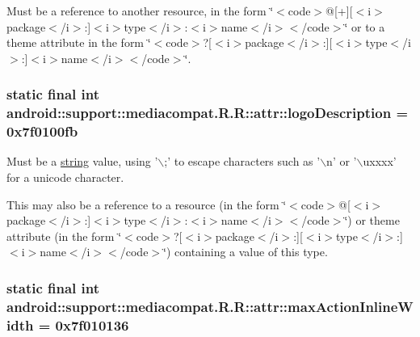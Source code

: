 Must be a reference to another resource, in the form \char`\"{}$<$code$>$@\mbox{[}+\mbox{]}\mbox{[}$<$i$>$package$<$/i$>$:\mbox{]}$<$i$>$type$<$/i$>$:$<$i$>$name$<$/i$>$$<$/code$>$\char`\"{} or to a theme attribute in the form \char`\"{}$<$code$>$?\mbox{[}$<$i$>$package$<$/i$>$:\mbox{]}\mbox{[}$<$i$>$type$<$/i$>$:\mbox{]}$<$i$>$name$<$/i$>$$<$/code$>$\char`\"{}. \hypertarget{classandroid_1_1support_1_1mediacompat_1_1_r_1_1attr_58b67763c19a3b84ff3f81473e75b009}{
\subsubsection[{logoDescription}]{\setlength{\rightskip}{0pt plus 5cm}static final int android::support::mediacompat.R.R::attr::logoDescription = 0x7f0100fb}}
\label{classandroid_1_1support_1_1mediacompat_1_1_r_1_1attr_58b67763c19a3b84ff3f81473e75b009}


Must be a \hyperlink{classandroid_1_1support_1_1mediacompat_1_1_r_1_1string}{string} value, using '$\backslash$;' to escape characters such as '$\backslash$n' or '$\backslash$uxxxx' for a unicode character. 

This may also be a reference to a resource (in the form \char`\"{}$<$code$>$@\mbox{[}$<$i$>$package$<$/i$>$:\mbox{]}$<$i$>$type$<$/i$>$:$<$i$>$name$<$/i$>$$<$/code$>$\char`\"{}) or theme attribute (in the form \char`\"{}$<$code$>$?\mbox{[}$<$i$>$package$<$/i$>$:\mbox{]}\mbox{[}$<$i$>$type$<$/i$>$:\mbox{]}$<$i$>$name$<$/i$>$$<$/code$>$\char`\"{}) containing a value of this type. \hypertarget{classandroid_1_1support_1_1mediacompat_1_1_r_1_1attr_6cf00d1a952d26907671561e77becb90}{
\subsubsection[{maxActionInlineWidth}]{\setlength{\rightskip}{0pt plus 5cm}static final int android::support::mediacompat.R.R::attr::maxActionInlineWidth = 0x7f010136}}
\label{classandroid_1_1support_1_1mediacompat_1_1_r_1_1attr_6cf00d1a952d26907671561e77becb90}


